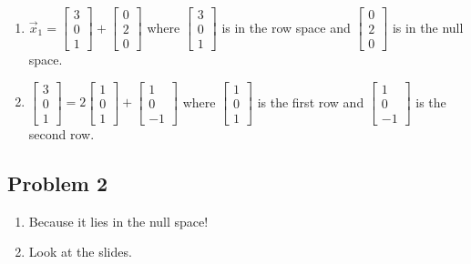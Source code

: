 \documentclass[11pt]{article}
\begin{document}
\begin{enumerate}
    \item[(f)] $\vec{x}_1=\begin{bmatrix} 3\\ 0 \\ 1\end{bmatrix} + \begin{bmatrix} 0 \\ 2 \\ 0 \end{bmatrix}$ where $\begin{bmatrix} 3\\ 0 \\ 1\end{bmatrix}$ is in the row space and $\begin{bmatrix} 0 \\ 2 \\ 0 \end{bmatrix}$ is in the null space.
    \item[(g)] $\begin{bmatrix} 3\\ 0 \\ 1\end{bmatrix}= 2\begin{bmatrix} 1\\ 0 \\ 1\end{bmatrix} + \begin{bmatrix} 1\\ 0 \\ -1\end{bmatrix}$ where $\begin{bmatrix} 1\\ 0 \\ 1\end{bmatrix}$ is the first row and $\begin{bmatrix} 1\\ 0 \\ -1\end{bmatrix}$ is the second row.
\end{enumerate}

\subsection*{Problem 2}
\begin{enumerate}
    \item[(a)] Because it lies in the null space!
    \item[(b)-(d)] Look at the slides.
\end{enumerate}
\end{document}
